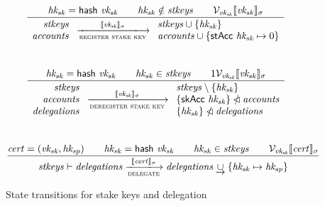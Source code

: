 \documentclass[11pt,a4paper]{article}
\begin{document}
\begin{figure}
\begin{equation*}
\frac{
  \var{hk_{sk}} = \fun{hash} ~ \var{vk_{sk}} \qquad
  \var{hk_{sk}} \notin \var{stkeys} \qquad
  \verified{\var{vk_{sk}}}{\var{vk_{sk}}}{\sigma}
}{
  \begin{array}{r}
    \var{stkeys} \\
    \var{accounts}
  \end{array}
  \transitionarrow{register stake key}
                  {\signed{\var{vk_{sk}}}{\sigma}}
  \begin{array}{l}
    \var{stkeys} \union \{\var{hk_{sk}}\} \\
    \var{accounts} \union \{\fun{stAcc}~\var{hk_{sk}} \mapsto 0\}
  \end{array}
}
\end{equation*}
%
\\[1em]
%
\begin{equation*}
\frac{
  \var{hk_{sk}} = \fun{hash} ~ \var{vk_{sk}} \qquad
  \var{hk_{sk}} \in \var{stkeys} \qquad
1  \verified{\var{vk_{sk}}}{\var{vk_{sk}}}{\sigma}
}{
  \begin{array}{r}
    \var{stkeys} \\ \var{accounts} \\ \var{delegations}
  \end{array}
  \transitionarrow{deregister stake key}
                  {\signed{\var{vk_{sk}}}{\sigma}}
  \begin{array}{l}
  \var{stkeys} \setminus \{\var{hk_{sk}}\} \\
  \{\fun{skAcc}~\var{hk_{sk}}\} \subtractdom \var{accounts} \\
  \{\var{hk_{sk}}\} \subtractdom \var{delegations}
  \end{array}
}
\end{equation*}
%
\\[1em]
%
\begin{equation*}
\frac{
  \var{cert} = (\var{vk_{sk}}, \var{hk_{sp}}) \qquad
  \var{hk_{sk}} = \fun{hash} ~ \var{vk_{sk}} \qquad
  \var{hk_{sk}} \in \var{stkeys} \qquad
  \verified{\var{vk_{sk}}}{\var{cert}}{\sigma}
}{
  \var{stkeys} \vdash \var{delegations}
  \transitionarrow{delegate}
                  {\signed{\var{cert}}{\sigma}}
  \var{delegations} \unionoverride \{\var{hk_{sk}} \mapsto \var{hk_{sp}}\}
}
\end{equation*}

\caption{State transitions for stake keys and delegation}
\label{fig:delegation_transitions}
\end{figure}
\end{document}
